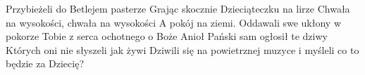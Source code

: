 \beginverse
Przybieżeli do Betlejem pasterze
Grając skocznie Dzieciąteczku na lirze
\endverse
\beginchorus
Chwała na wysokości, chwała na wysokości
A pokój na ziemi.
\endchorus
\beginverse
Oddawali swe ukłony w pokorze
Tobie z serca ochotnego o Boże
\endverse
\beginverse
Anioł Pański sam ogłosił te dziwy
Których oni nie słyszeli jak żywi
\endverse
\beginverse
Dziwili się na powietrznej muzyce
i myśleli co to będzie za Dziecię?
\endverse
\endsong
